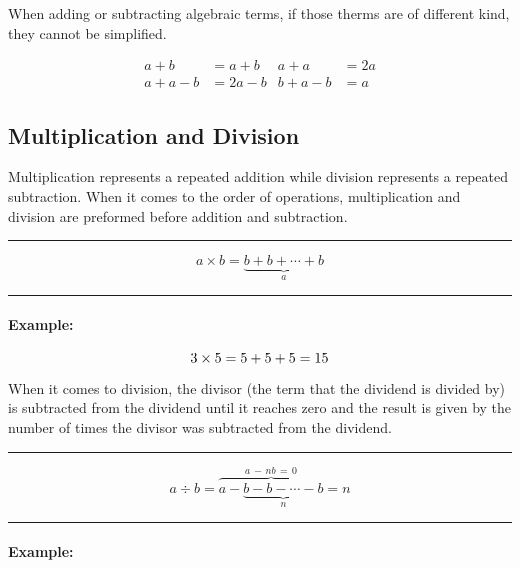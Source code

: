 \documentclass[a5paper,9pt]{book}
\theoremstyle{definition}
\newcommand{\eqlinesur}[1]{%
    \vspace*{\baselineskip}

    \hrule%

    \vspace*{\medskipamount}

    #1

    \vspace*{\medskipamount-0.5\belowdisplayskip}

    \hrule%

    \vspace*{\baselineskip}
}
\begin{document}
                When adding or subtracting algebraic terms, if those therms are of different
                kind, they cannot be simplified. 

                \begin{align*}
                    a + b &= a + b & a + a &= 2a \\
                    a + a - b &= 2a - b & b + a - b &= a
                \end{align*}

            \subsection{Multiplication and Division}

                Multiplication represents a repeated addition while division represents
                a repeated subtraction. When it comes to the order of operations, multiplication
                and division are preformed before addition and subtraction.

                \eqlinesur{\begin{equation*}
                    a\times b = \underset{a}{\underbrace{b + b + \cdots + b}}
                \end{equation*}}

                \paragraph{Example:}

                \begin{equation*}
                    3\times 5 = 5 + 5 + 5 = 15\\ [5pt]
                \end{equation*}

                When it comes to division, the divisor (the term that the dividend is divided by)
                is subtracted from the dividend until it reaches zero and the result is given
                by the number of times the divisor was subtracted from the dividend.

                \eqlinesur{\begin{equation*}
                        a\div b = \overset{a\,-\,nb\,=\,0}{\overbrace{a - \underset{n}{\underbrace{b - b - \cdots - b}}}} = n
                \end{equation*}}

                \paragraph{Example:}
\end{document}
